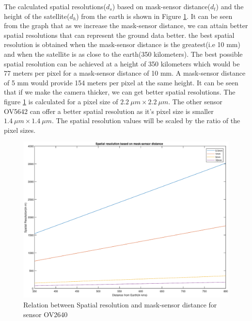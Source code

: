 The calculated spatial resolutions($d_s$) based on mask-sensor distance($d_t$) and the height of the satellite($d_h$) from the earth is shown in Figure \ref{fig:spat-res-graph-1}. It can be seen from the graph that as we increase the mask-sensor distance, we can attain better spatial resolutions that can represent the ground data better. the best spatial resolution is obtained when the mask-sensor distance is the greatest(i.e 10 mm) and when the satellite is as close to the earth(350 kilometers). The best possible spatial resolution can be achieved at a height of 350 kilometers which would be 77 meters per pixel for a mask-sensor distance of 10 mm. A mask-sensor distance of 5 mm would provide 154 meters per pixel at the same height. It can be seen that if we make the camera thicker, we can get better spatial resolutions. The figure \ref{fig:spat-res-graph-1} is calculated for a pixel size of $2.2 \ \mu m \times 2.2 \ \mu m$. The other sensor OV5642 can offer a better spatial resolution as it's pixel size is smaller $1.4 \ \mu m \times 1.4 \ \mu m$. The spatial resolution values will be scaled by the ratio of the pixel sizes. 

\begin{figure}[]
\centering
\includegraphics[width = \linewidth]{pics/spatial_res}
\caption{Relation between Spatial resolution and mask-sensor distance for sensor OV2640}
\label{fig:spat-res-graph-1}
\end{figure}

